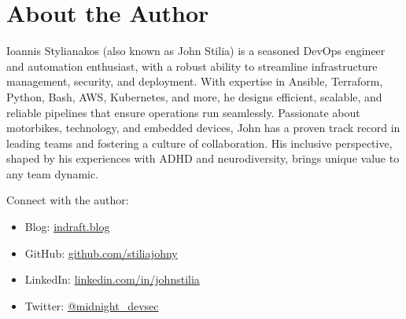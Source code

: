 \chapter*{About the Author}


\noindent Ioannis Stylianakos (also known as John Stilia) is a seasoned DevOps engineer and automation enthusiast, with a robust ability to streamline infrastructure management, security, and deployment. With expertise in Ansible, Terraform, Python, Bash, AWS, Kubernetes, and more, he designs efficient, scalable, and reliable pipelines that ensure operations run seamlessly. Passionate about motorbikes, technology, and embedded devices, John has a proven track record in leading teams and fostering a culture of collaboration. His inclusive perspective, shaped by his experiences with ADHD and neurodiversity, brings unique value to any team dynamic.


\vspace{1cm}
\noindent Connect with the author:
{\sloppy\raggedright
\begin{itemize}
    \item Blog: \url{indraft.blog}
    \item GitHub: \url{github.com/stiliajohny}
    \item LinkedIn: \url{linkedin.com/in/johnstilia}
    \item Twitter: \url{@midnight\_devsec}
\end{itemize}
}